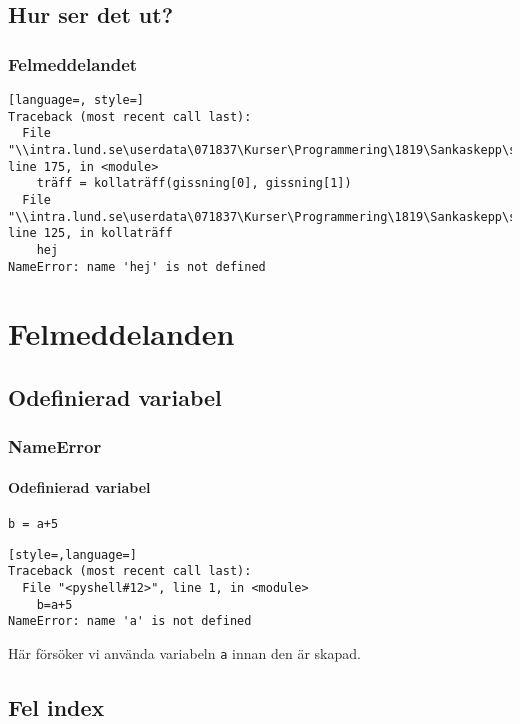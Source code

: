 \documentclass[aspectratio=169]{beamer}
\begin{document}
\subsection{Hur ser det ut?}

\begin{frame}[fragile]
\frametitle{Felmeddelandet}

\begin{lstlisting}[language=, style=]
Traceback (most recent call last):
  File "\\intra.lund.se\userdata\071837\Kurser\Programmering\1819\Sankaskepp\sankaskepp.py", line 175, in <module>
    träff = kollaträff(gissning[0], gissning[1])
  File "\\intra.lund.se\userdata\071837\Kurser\Programmering\1819\Sankaskepp\sankaskepp.py", line 125, in kollaträff
    hej
NameError: name 'hej' is not defined
\end{lstlisting}

\end{frame}

\section{Felmeddelanden}

\subsection{Odefinierad variabel}

\begin{frame}[fragile]
\frametitle{NameError}
\framesubtitle{Odefinierad variabel}

\begin{lstlisting}
b = a+5
\end{lstlisting}

\begin{lstlisting}[style=,language=]
Traceback (most recent call last):
  File "<pyshell#12>", line 1, in <module>
    b=a+5
NameError: name 'a' is not defined
\end{lstlisting}

Här försöker vi använda variabeln \texttt{a} innan den är skapad.

\end{frame}

\subsection{Fel index}
\end{document}
